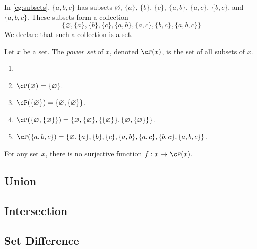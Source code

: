 \documentclass{amsart}
\begin{document}
In \cref{eg:subsets}, $\{ a,b,c \}$ has subsets $\varnothing$, $\{ a \}$, $\{ b \}$, $\{ c \}$, $\{ a,b \}$, $\{ a,c \}$, $\{ b,c \}$, and $\{ a,b,c \}$.
These subsets form a collection
\[
  \{ \varnothing, \{ a \}, \{ b \}, \{ c \}, \{ a,b \}, \{ a,c \}, \{ b,c \}, \{ a,b,c \} \}
\]
We declare that such a collection is a set.

\begin{defn}
  Let $x$ be a set.
  The \emph{power set} of $x$, denoted $\cP(x)$, is the set of all subsets of $x$.
\end{defn}


\begin{eg}\label{eg:subsets}
  \begin{enumerate}
  \item[]
  \item $\cP(\varnothing) = \{\varnothing\}$.
  \item $\cP(\{ \varnothing \}) = \{\varnothing, \{\varnothing\}\}$.
  \item $\cP(\{\varnothing, \{\varnothing\}\}) = \{ \varnothing, \{\varnothing\}, \{\{\varnothing\}\}, \{\varnothing, \{\varnothing\}\} \}$.
  \item $\cP(\{ a,b,c \}) = \{ \varnothing, \{ a \}, \{ b \}, \{ c \}, \{ a,b \}, \{ a,c \}, \{ b,c \}, \{ a,b,c \} \}$.
  \end{enumerate}
\end{eg}

\begin{thm}
  For any set $x$, there is no surjective function $f : x \to \cP(x)$.
\end{thm}

\subsection{Union}
\label{sec:union}

\subsection{Intersection}
\label{sec:intersection}

\subsection{Set Difference}
\label{sec:set-difference}
\end{document}
